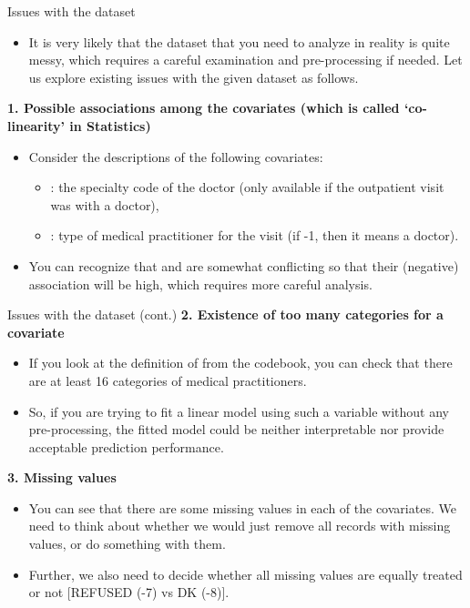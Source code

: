 \begin{frame}{Issues with the dataset}
\begin{itemize}
  \item It is very likely that the dataset that you need to analyze in reality is quite messy, which requires a careful examination and pre-processing if needed. Let us explore existing issues with the given dataset as follows.
\end{itemize}
\textbf{1. Possible associations among the covariates (which is called ‘co-linearity’ in Statistics)}
\begin{itemize}
  \item Consider the descriptions of the following covariates:
  \begin{itemize}
    \item {}: the specialty code of the doctor (only available if the outpatient visit was with a doctor),
    \item {}: type of medical practitioner for the visit (if -1, then it means a doctor).
  \end{itemize}
  \item You can recognize that  and  are somewhat conflicting so that their (negative) association will be high, which requires more careful analysis.
\end{itemize}
\end{frame}

\begin{frame}{Issues with the dataset (cont.)}
\textbf{2. Existence of too many categories for a covariate}
\begin{itemize}
  \item If you look at the definition of  from the codebook, you can check that there are at least 16 categories of medical practitioners.
  \item So, if you are trying to fit a linear model using such a variable without any pre-processing, the fitted model could be neither interpretable nor provide acceptable prediction performance.
\end{itemize}
\medskip
\textbf{3. Missing values}
\begin{itemize}
  \item You can see that there are some missing values in each of the covariates. We need to think about whether we would just remove all records with missing values, or do something with them.
  \item Further, we also need to decide whether all missing values are equally treated or not [REFUSED (-7) vs DK (-8)].
\end{itemize}
\end{frame}

